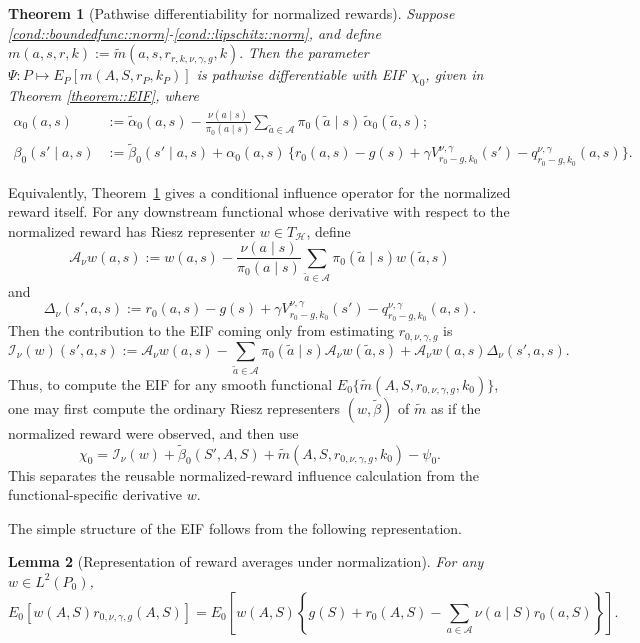 \documentclass[12pt]{article}
\theoremstyle{plain}
\newtheorem{theorem}{Theorem}
\newtheorem{lemma}[theorem]{Lemma}
\begin{document}
\begin{theorem}[Pathwise differentiability for normalized rewards]
\label{theorem::EIFnorm}
Suppose \ref{cond::boundedfunc::norm}-\ref{cond::lipschitz::norm}, and define $m(a,s,r,k) := \tilde{m}(a,s,r_{r,k,\nu,\gamma,g},k).$ Then the parameter $\Psi: P \mapsto E_P[m(A,S,r_P,k_P)]$
is pathwise differentiable with EIF $\chi_0$, given in Theorem \ref{theorem::EIF}, where
 \begin{align*}
	      \alpha_0(a,s)
	      &:= \tilde{\alpha}_0(a,s)
	      - \frac{\nu(a \mid s)}{\pi_0(a \mid s)}
	         \sum_{\tilde a \in \mathcal{A}} \pi_0(\tilde a \mid s)\,
	         \tilde{\alpha}_0(\tilde a,s); \\[6pt]
	      \beta_0(s' \mid a,s) 
	      &:= \tilde{\beta}_{0}(s' \mid a,s)
	         + \alpha_0(a,s)\,
	           \Big\{r_0(a,s) - g(s) + \gamma V_{r_0-g, k_0}^{\nu, \gamma}(s') 
	           - q_{r_0-g, k_0}^{\nu, \gamma}(a,s)\Big\}.
	\end{align*}
\end{theorem}
\noindent Equivalently, Theorem~\ref{theorem::EIFnorm} gives a conditional
influence operator for the normalized reward itself.  For any downstream
functional whose derivative with respect to the normalized reward has Riesz
representer \(w\in T_{\mathcal H}\), define
\[
\mathcal A_\nu w(a,s)
:= w(a,s)
- \frac{\nu(a\mid s)}{\pi_0(a\mid s)}
   \sum_{\tilde a\in\mathcal A}\pi_0(\tilde a\mid s)w(\tilde a,s)
\]
and
\[
\Delta_\nu(s',a,s)
:= r_0(a,s)-g(s)
   +\gamma V_{r_0-g,k_0}^{\nu,\gamma}(s')
   -q_{r_0-g,k_0}^{\nu,\gamma}(a,s).
\]
Then the contribution to the EIF coming only from estimating
\(r_{0,\nu,\gamma,g}\) is
\[
\mathcal I_\nu(w)(s',a,s)
:= \mathcal A_\nu w(a,s)
   -\sum_{\tilde a\in\mathcal A}\pi_0(\tilde a\mid s)
      \mathcal A_\nu w(\tilde a,s)
   + \mathcal A_\nu w(a,s)\Delta_\nu(s',a,s).
\]
Thus, to compute the EIF for any smooth functional
\(E_0\{\tilde m(A,S,r_{0,\nu,\gamma,g},k_0)\}\), one may first compute the
ordinary Riesz representers \((w,\tilde\beta)\) of \(\tilde m\) as if the
normalized reward were observed, and then use
\[
\chi_0
= \mathcal I_\nu(w)
  + \tilde\beta_0(S',A,S)
  + \tilde m(A,S,r_{0,\nu,\gamma,g},k_0)-\psi_0 .
\]
This separates the reusable normalized-reward influence calculation from the
functional-specific derivative \(w\).

\noindent The simple structure of the EIF follows from the following representation.

\begin{lemma}[Representation of reward averages under normalization]
\label{lemma::linearfuncidentnorm}
For any \(w\in L^2(P_0)\),
\[
E_0\!\left[w(A,S)r_{0,\nu,\gamma,g}(A,S)\right]
=
E_0\!\left[
w(A,S)\left\{g(S)+r_0(A,S)
-\sum_{a\in\mathcal A}\nu(a\mid S)r_0(a,S)\right\}
\right].
\]
\end{lemma}
\end{document}
